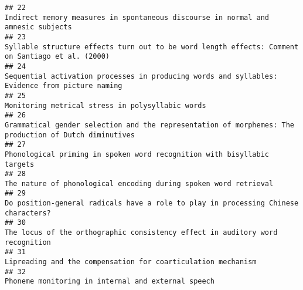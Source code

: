 \documentclass[
  english,
  man]{apa6}
\begin{document}
\begin{verbatim}
## 22                                                                                                                                                          Indirect memory measures in spontaneous discourse in normal and amnesic subjects
## 23                                                                                                                                          Syllable structure effects turn out to be word length effects: Comment on Santiago et al. (2000)
## 24                                                                                                                                            Sequential activation processes in producing words and syllables: Evidence from picture naming
## 25                                                                                                                                                                                          Monitoring metrical stress in polysyllabic words
## 26                                                                                                                                     Grammatical gender selection and the representation of morphemes: The production of Dutch diminutives
## 27                                                                                                                                                                   Phonological priming in spoken word recognition with bisyllabic targets
## 28                                                                                                                                                                          The nature of phonological encoding during spoken word retrieval
## 29                                                                                                                                                        Do position-general radicals have a role to play in processing Chinese characters?
## 30                                                                                                                                                             The locus of the orthographic consistency effect in auditory word recognition
## 31                                                                                                                                                                              Lipreading and the compensation for coarticulation mechanism
## 32                                                                                                                                                                                        Phoneme monitoring in internal and external speech

\end{verbatim}
\end{document}
